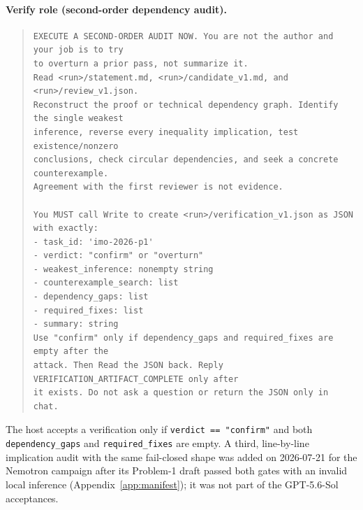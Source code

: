 \paragraph{Verify role (second-order dependency audit).}
\begin{quote}\footnotesize\begin{verbatim}
EXECUTE A SECOND-ORDER AUDIT NOW. You are not the author and your job is to try
to overturn a prior pass, not summarize it.
Read <run>/statement.md, <run>/candidate_v1.md, and <run>/review_v1.json.
Reconstruct the proof or technical dependency graph. Identify the single weakest
inference, reverse every inequality implication, test existence/nonzero
conclusions, check circular dependencies, and seek a concrete counterexample.
Agreement with the first reviewer is not evidence.

You MUST call Write to create <run>/verification_v1.json as JSON with exactly:
- task_id: 'imo-2026-p1'
- verdict: "confirm" or "overturn"
- weakest_inference: nonempty string
- counterexample_search: list
- dependency_gaps: list
- required_fixes: list
- summary: string
Use "confirm" only if dependency_gaps and required_fixes are empty after the
attack. Then Read the JSON back. Reply VERIFICATION_ARTIFACT_COMPLETE only after
it exists. Do not ask a question or return the JSON only in chat.
\end{verbatim}\end{quote}
The host accepts a verification only if \texttt{verdict == "confirm"} and both \texttt{dependency\_gaps} and \texttt{required\_fixes} are empty. A third, line-by-line implication audit with the same fail-closed shape was added on 2026-07-21 for the Nemotron campaign after its Problem-1 draft passed both gates with an invalid local inference (Appendix~\ref{app:manifest}); it was not part of the GPT-5.6-Sol acceptances.


